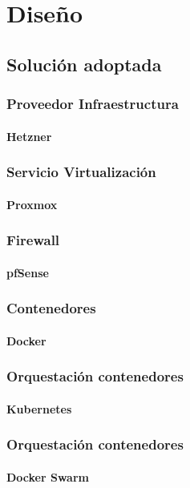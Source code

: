 \chapter {Diseño}

\section{Solución adoptada}
	\subsection{Proveedor Infraestructura}
		\subsubsection{Hetzner}
	\subsection{Servicio Virtualización}
		\subsubsection{Proxmox}
	\subsection{Firewall}
		\subsubsection{pfSense}
	\subsection{Contenedores}
		\subsubsection{Docker}
	\subsection{Orquestación contenedores}
		\subsubsection{Kubernetes}
	\subsection{Orquestación contenedores}
		\subsubsection{Docker Swarm}
